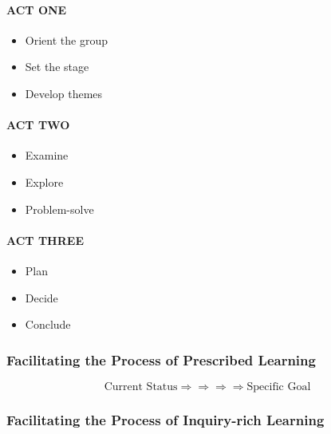 \documentclass[
]{book}
\providecommand{\tightlist}{%
  \setlength{\itemsep}{0pt}\setlength{\parskip}{0pt}}
\begin{document}
\hypertarget{act-one}{%
\paragraph*{ACT ONE}\label{act-one}}

\begin{itemize}
\tightlist
\item
  Orient the group
\item
  Set the stage
\item
  Develop themes
\end{itemize}

\hypertarget{act-two}{%
\paragraph*{ACT TWO}\label{act-two}}

\begin{itemize}
\tightlist
\item
  Examine
\item
  Explore
\item
  Problem-solve
\end{itemize}

\hypertarget{act-three}{%
\paragraph*{ACT THREE}\label{act-three}}

\begin{itemize}
\tightlist
\item
  Plan
\item
  Decide
\item
  Conclude
\end{itemize}

\hypertarget{facilitating-the-process-of-prescribed-learning}{%
\subsubsection*{Facilitating the Process of Prescribed Learning}\label{facilitating-the-process-of-prescribed-learning}}

\[\text{Current Status}\Longrightarrow \Longrightarrow \Longrightarrow \Longrightarrow \text{Specific Goal}\]

\hypertarget{facilitating-the-process-of-inquiry-rich-learning}{%
\subsubsection*{Facilitating the Process of Inquiry-rich Learning}\label{facilitating-the-process-of-inquiry-rich-learning}}
\end{document}
